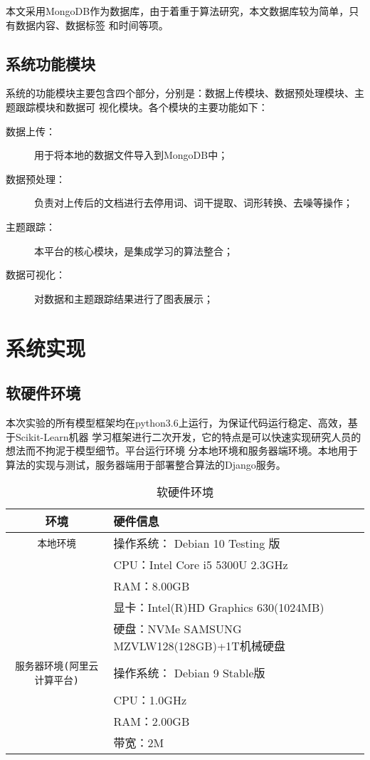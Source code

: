 本文采用MongoDB作为数据库，由于着重于算法研究，本文数据库较为简单，只有数据内容、数据标签
和时间等项。

\subsection{系统功能模块}
系统的功能模块主要包含四个部分，分别是：数据上传模块、数据预处理模块、主题跟踪模块和数据可
视化模块。各个模块的主要功能如下：
\begin{description}
\item [数据上传：]用于将本地的数据文件导入到MongoDB中；
\item [数据预处理：]负责对上传后的文档进行去停用词、词干提取、词形转换、去噪等操作；
\item [主题跟踪：]本平台的核心模块，是集成学习的算法整合；
\item [数据可视化：]对数据和主题跟踪结果进行了图表展示；
\end{description}

\section{系统实现}

\subsection{软硬件环境}
本次实验的所有模型框架均在python3.6上运行，为保证代码运行稳定、高效，基于Scikit-Learn机器
学习框架进行二次开发，它的特点是可以快速实现研究人员的想法而不拘泥于模型细节。平台运行环境
分本地环境和服务器端环境。本地用于算法的实现与测试，服务器端用于部署整合算法的Django服务。

\begin{table}[H]
  \begin{singlespace}
    \renewcommand{\arraystretch}{1.5} %
    \centering\caption{软硬件环境}\label{tab:env}                              
    \begin{tabular}{cl}\hline
      环境 & 硬件信息 \\ \hline                                                
      \verb|本地环境| & 操作系统： Debian 10 Testing 版 \\
           & CPU：Intel Core i5 5300U 2.3GHz \\
           & RAM：8.00GB \\
           & 显卡：Intel(R)HD Graphics 630(1024MB)  \\      
           & 硬盘：NVMe SAMSUNG MZVLW128(128GB)+1T机械硬盘 \\ \hline
      \verb|服务器环境(阿里云计算平台)| & 操作系统： Debian 9 Stable版 \\
           & CPU：1.0GHz \\
           & RAM：2.00GB \\
           & 带宽：2M \\ \hline
    \end{tabular}                                                              
  \end{singlespace}                                                            \end{table}               

